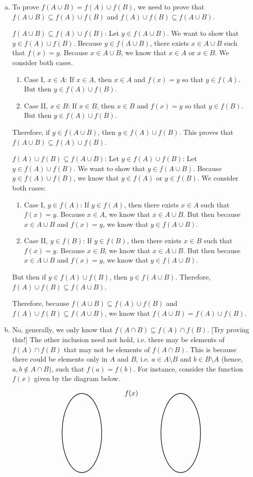 \documentclass[11pt,letterpaper]{article}
\begin{document}
\sol 
\begin{enumerate}[(a)]
\item To prove $f(A \cup B)= f(A) \cup f(B)$, we need to prove that $f(A \cup B) \subseteq f(A) \cup f(B)$ and $f(A) \cup f(B) \subseteq f(A \cup B)$. \pspace

$f(A \cup B) \subseteq f(A) \cup f(B)$: Let $y \in f(A \cup B)$. We want to show that $y \in f(A) \cup f(B)$. Because $y \in f(A \cup B)$, there exists $x \in A \cup B$ such that $f(x)= y$. Because $x \in A \cup B$, we know that $x \in A$ or $x \in B$. We consider both cases.
	\begin{enumerate}
	\item[] Case I, $x \in A$: If $x \in A$, then $x \in A$ and $f(x)= y$ so that $y \in f(A)$. But then $y \in f(A) \cup f(B)$. 
	\item[] Case II, $x \in B$: If $x \in B$, then $x \in B$ and $f(x)= y$ so that $y \in f(B)$. But then $y \in f(A) \cup f(B)$. 
	\end{enumerate}
Therefore, if $y \in f(A \cup B)$, then $y \in f(A) \cup f(B)$. This proves that $f(A \cup B) \subseteq f(A) \cup f(B)$. \pspace

$f(A) \cup f(B) \subseteq f(A \cup B)$: Let $y \in f(A) \cup f(B)$: Let $y \in f(A) \cup f(B)$. We want to show that $y \in f(A \cup B)$. Because $y \in f(A) \cup f(B)$, we know that $y \in f(A)$ or $y \in f(B)$. We consider both cases:
	\begin{enumerate}
	\item[] Case I, $y \in f(A)$: If $y \in f(A)$, then there exists $x \in A$ such that $f(x)= y$. Because $x \in A$, we know that $x \in A \cup B$. But then because $x \in A \cup B$ and $f(x)= y$, we know that $y \in f(A \cup B)$. 
	\item[] Case II, $y \in f(B)$: If $y \in f(B)$, then there exists $x \in B$ such that $f(x)= y$. Because $x \in B$, we know that $x \in A \cup B$. But then because $x \in A \cup B$ and $f(x)= y$, we know that $y \in f(A \cup B)$. 
	\end{enumerate}
But then if $y \in f(A) \cup f(B)$, then $y \in f(A \cup B)$. Therefore, $f(A) \cup f(B) \subseteq f(A \cup B)$. \pspace

Therefore, because $f(A \cup B) \subseteq f(A) \cup f(B)$ and $f(A) \cup f(B) \subseteq f(A \cup B)$, we know that $f(A \cup B)= f(A) \cup f(B)$. \pspace


\item No, generally, we only know that $f(A \cap B) \subseteq f(A) \cap f(B)$. [Try proving this!] The other inclusion need not hold, i.e. there may be elements of $f(A) \cap f(B)$ that may not be elements of $f(A \cap B)$. This is because there could be elements only in $A$ and $B$, i.e. $a \in A \setminus B$ and $b \in B \setminus A$ (hence, $a, b \notin A \cap B$), such that $f(a)= f(b)$. For instance, consider the function $f(x)$ given by the diagram below. 
	\[
	\begin{tikzpicture}
	\node at (2.5,2) {$f(x)$};
	\draw[line width=0.03cm] (0,0) circle (1 and 2);
	\draw[line width=0.03cm] (5,0) circle (1 and 2);
	

\end{tikzpicture}\]
\end{enumerate}
\end{document}
